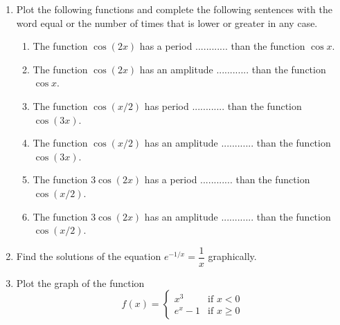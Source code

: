 \begin{enumerate}[leftmargin=*]
\item Plot the following functions and complete the following sentences with the word equal or the number of times that is lower or greater in any case.
      \begin{enumerate}
      \item The function $\cos(2x)$ has a period ............ than the function $\cos{x}$.
      \item The function $\cos(2x)$ has an amplitude ............ than the function $\cos{x}$.
      \item The function $\cos(x/2)$ has period ............ than the function $\cos(3x)$.
      \item The function $\cos(x/2)$ has an amplitude ............ than the function $\cos(3x)$.
      \item The function $3\cos(2x)$ has a period ............ than the function $\cos(x/2)$.
      \item The function $3\cos(2x)$ has an amplitude ............ than the function $\cos(x/2)$.
      \end{enumerate}

\item Find the solutions of the equation $e^{-1/x}=\dfrac{1}{x}$  graphically.

\item Plot the graph of the function
      \[
      f(x)=
      \begin{cases}
      x^3   & \mbox{if $x<0$}    \\
      e^x-1 & \mbox{if $x\geq0$}
      \end{cases}
      \]
\end{enumerate}
